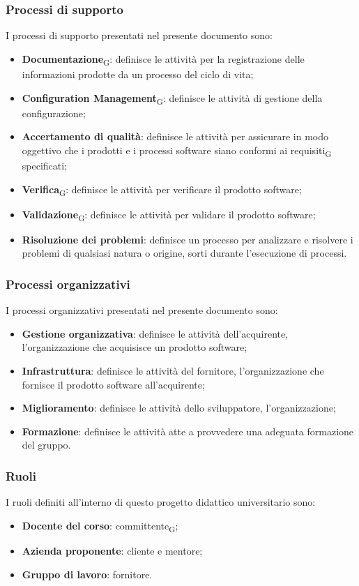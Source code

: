 \subsubsection{Processi di supporto}
I processi di supporto presentati nel presente documento sono:
\begin{itemize}
\item \textbf{Documentazione}\textsubscript{G}: definisce le attività per la registrazione delle informazioni prodotte da un processo del ciclo di vita;
\item \textbf{Configuration Management}\textsubscript{G}: definisce le attività di gestione della configurazione;
\item \textbf{Accertamento di qualità}: definisce le attività per assicurare in modo oggettivo che i prodotti e i processi software siano conformi ai requisiti\textsubscript{G} specificati;
\item \textbf{Verifica}\textsubscript{G}: definisce le attività per verificare il prodotto software;
\item \textbf{Validazione}\textsubscript{G}: definisce le attività per validare il prodotto software;
\item \textbf{Risoluzione dei problemi}: definisce un processo per analizzare e risolvere i problemi di qualsiasi natura o origine, sorti durante l’esecuzione di processi.
\end{itemize}


\subsubsection{Processi organizzativi}
I processi organizzativi presentati nel presente documento sono:
\begin{itemize}
\item \textbf{Gestione organizzativa}: definisce le attività dell’acquirente, l’organizzazione che acquisisce un prodotto software;
\item \textbf{Infrastruttura}: definisce le attività del fornitore, l’organizzazione che fornisce il prodotto software all’acquirente;
\item \textbf{Miglioramento}: definisce le attività dello sviluppatore, l’organizzazione;
\item \textbf{Formazione}: definisce le attività atte a provvedere una adeguata formazione del gruppo.
\end{itemize}

\subsubsection{Ruoli}
I ruoli definiti all’interno di questo progetto didattico universitario sono:
\begin{itemize}
\item \textbf{Docente del corso}: committente\textsubscript{G};
\item \textbf{Azienda proponente}: cliente e mentore;
\item \textbf{Gruppo di lavoro}: fornitore.
\end{itemize}